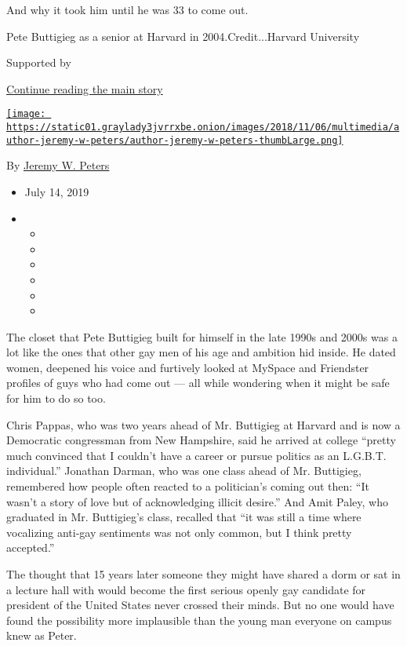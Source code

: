 And why it took him until he was 33 to come out.

Pete Buttigieg as a senior at Harvard in 2004.Credit...Harvard
University

Supported by

\protect\hyperlink{after-sponsor}{Continue reading the main story}

\href{https://www.nytimes3xbfgragh.onion/by/jeremy-w-peters}{\texttt{[image: https://static01.graylady3jvrrxbe.onion/images/2018/11/06/multimedia/author-jeremy-w-peters/author-jeremy-w-peters-thumbLarge.png]}}

By \href{https://www.nytimes3xbfgragh.onion/by/jeremy-w-peters}{Jeremy
W. Peters}

\begin{itemize}
\item
  July 14, 2019
\item
  \begin{itemize}
  \item
  \item
  \item
  \item
  \item
  \item
  \end{itemize}
\end{itemize}

The closet that Pete Buttigieg built for himself in the late 1990s and
2000s was a lot like the ones that other gay men of his age and ambition
hid inside. He dated women, deepened his voice and furtively looked at
MySpace and Friendster profiles of guys who had come out --- all while
wondering when it might be safe for him to do so too.

Chris Pappas, who was two years ahead of Mr. Buttigieg at Harvard and is
now a Democratic congressman from New Hampshire, said he arrived at
college ``pretty much convinced that I couldn't have a career or pursue
politics as an L.G.B.T. individual.'' Jonathan Darman, who was one class
ahead of Mr. Buttigieg, remembered how people often reacted to a
politician's coming out then: ``It wasn't a story of love but of
acknowledging illicit desire.'' And Amit Paley, who graduated in Mr.
Buttigieg's class, recalled that ``it was still a time where vocalizing
anti-gay sentiments was not only common, but I think pretty accepted.''

The thought that 15 years later someone they might have shared a dorm or
sat in a lecture hall with would become the first serious openly gay
candidate for president of the United States never crossed their minds.
But no one would have found the possibility more implausible than the
young man everyone on campus knew as Peter.

